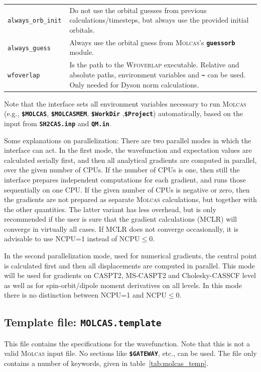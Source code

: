 \documentclass[a4paper,11pt,DIV=15,openany,twoside=false]{scrbook}
\newcommand{\ttt}[1]{\textbf{\texttt{#1}}}
\begin{document}
\begin{table}
\begin{tabular}{>{\tt}lp{12cm}}
always\_orb\_init &Do not use the orbital guesses from previous calculations/timesteps, but always use the provided initial orbitals.\\
always\_guess   &Always use the orbital guess from \textsc{Molcas}'s \ttt{guessorb} module.\\
wfoverlap       &Is the path to the \textsc{Wfoverlap} executable. Relative and absolute paths, environment variables and \ttt{\textasciitilde} can be used. Only needed for Dyson norm calculations.\\
  \bottomrule
  \end{tabular}
\end{table}

Note that the interface sets all environment variables necessary to run \textsc{Molcas} (e.g., \ttt{\$MOLCAS}, \ttt{\$MOLCASMEM}, \ttt{\$WorkDir} ,\ttt{\$Project}) automatically, based on the input from \ttt{SH2CAS.inp} and \ttt{QM.in}.

Some explanations on parallelization: There are two parallel modes in which the interface can act. In the first mode, the wavefunction and expectation values are calculated serially first, and then all analytical gradients are computed in parallel, over the given number of CPUs. If the number of CPUs is one, then still the interface prepares independent computations for each gradient, and runs those sequentially on one CPU. If the given number of CPUs is negative or zero, then the gradients are not prepared as separate \textsc{Molcas} calculations, but together with the other quantities. The latter variant has less overhead, but is only recommended if the user is sure that the gradient calculations (MCLR) will converge in virtually all cases. If MCLR does not converge occasionally, it is advisable to use NCPU=1 instead of NCPU$\leq$0.

In the second parallelization mode, used for numerical gradients, the central point is calculated first and then all displacements are computed in parallel. This mode will be used for gradients on CASPT2, MS-CASPT2 and Cholesky-CASSCF level as well as for spin-orbit/dipole moment derivatives on all levels. In this mode there is no distinction between NCPU=1 and NCPU$\leq$0. 

\subsection{Template file: \ttt{MOLCAS.template}}

This file contains the specifications for the wavefunction. Note that this is not a valid \textsc{Molcas} input file. No sections like \ttt{\$GATEWAY}, etc., can be used. The file only contains a number of keywords, given in table~\ref{tab:molcas_temp}.
\end{document}
